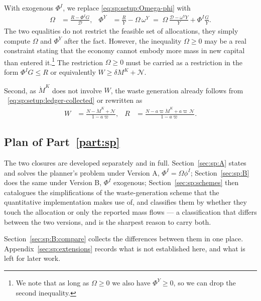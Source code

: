  With exogenous $\Phi^I$, we replace \eqref{eq:sp:setup:Omega-phi} with 
\begin{align}
\Omega &= \frac{R-\Phi^IG}{\mathcal D},
&
\Phi^Y &= \frac{R}{Y}-\Omega\,\omega^Y
\;=\;\Omega\,\frac{\mathcal D-\omega^YY}{Y}+\Phi^I\frac{G}{Y}.
\label{eq:sp:setup:Omega}
\end{align}
The two equalities do not restrict the feasible set of allocations, they simply compute $\Omega$ and $\Phi^Y$ after the fact. However, the inequality $\Omega\ge0$ may be a real constraint stating that the economy cannot embody more mass in new capital than entered it.\footnote{We note that as long as $\Omega\geq0$ we also have $\Phi^Y\geq0$, so we can drop the second inequality.} The restriction $\Omega\geq0$ must be carried as a restriction in the form $\Phi^IG\leq R$ or equivalently $W\geq \delta M^K+\mathcal{N}$. 

Second, as $\dot M^K$ does not involve $W$, the waste generation already follows from ~\eqref{eq:sp:setup:ledger-collected} or rewritten as
\begin{align}
W &= \frac{N-\dot M^K+\mathcal N}{1-a\varpi},
&
R &= \frac{N-a\varpi\dot M^K+a\varpi\,\mathcal N}{1-a\varpi}.
\label{eq:sp:setup:ledger-solved}
\end{align}


\subsection{Plan of Part~\ref{part:sp}}
\label{sec:sp:setup:plan}
The two closures are developed separately and in full. Section~\ref{sec:sp:A} states and solves the planner's problem under Version A, $\Phi^I=\Omega\phi^I$; Section~\ref{sec:sp:B} does the same under Version B, $\Phi^I$ exogenous; Section~\ref{sec:sp:schemes} then catalogues the simplifications of the waste-generation scheme that the quantitative implementation makes use of, and classifies them by whether they touch the allocation or only the reported mass flows --- a classification that differs between the two versions, and is the sharpest reason to carry both.

Section~\ref{sec:sp:B:compare} collects the differences between them in one place. Appendix~\ref{sec:sp:extensions} records what is not established here, and what is left for later work.